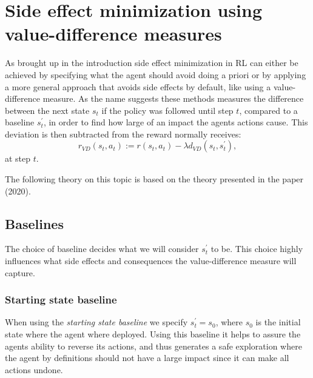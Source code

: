 \documentclass[12pt,A4]{report}
\theoremstyle{definition}
\begin{document}
\section{Side effect minimization using value-difference measures}
As brought up in the introduction side effect minimization in RL can either be achieved by specifying what the agent should avoid doing a priori or by applying a more general approach that avoids side effects by default, like using a value-difference measure. As the name suggests these methods measures the difference between the next state $s_t$ if the policy was followed until step $t$, compared to a baseline $s_t^\prime$, in order to find how large of an impact the agents actions cause. This deviation is then subtracted from the reward normally receives:
\[ r_{VD}(s_t,a_t) := r(s_t,a_t) - \lambda d_{VD}(s_t, s_t^\prime), \]
at step $t$. 

The following theory on this topic is based on the theory presented in the paper \autocite{Krakovna et al.}(2020).


\subsection{Baselines}
The choice of baseline decides what we will consider $s^{\prime}_t$ to be. This choice highly influences what side effects and consequences the value-difference measure will capture.

\subsubsection{Starting state baseline}
When using the \textit{starting state baseline} we specify $s^{\prime}_t = s_0$, where $s_0$ is the initial state where the agent where deployed. Using this baseline it helps to assure the agents ability to reverse its actions, and thus generates a safe exploration where the agent by definitions should not have a large impact since it can make all actions undone. %
\end{document}
